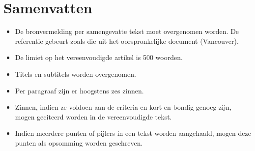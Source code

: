 \documentclass{report}
\begin{document}
	\section{Samenvatten}
	
\begin{itemize}
	\item De bronvermelding per samengevatte tekst moet overgenomen worden. De referentie gebeurt zoals die uit het oorspronkelijke document (Vancouver).
	\item De limiet op het vereenvoudigde artikel is 500 woorden. 
	\item Titels en subtitels worden overgenomen.
	\item Per paragraaf zijn er hoogstens zes zinnen.
	\item Zinnen, indien ze voldoen aan de criteria en kort en bondig genoeg zijn, mogen geciteerd worden in de vereenvoudigde tekst.
	\item Indien meerdere punten of pijlers in een tekst worden aangehaald, mogen deze punten als opsomming worden geschreven.
\end{itemize}
\end{document}
